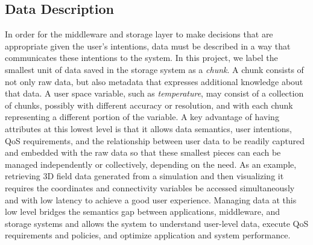 \subsection{Data Description}
In order for the middleware and storage layer to make decisions
that are appropriate given the user's intentions, data must be
described in a way that communicates these intentions to
the system. In this project, we label the smallest unit of data
saved in the storage system as a \textit{chunk}.  A chunk consists of not only
raw data, but also metadata that expresses additional
knowledge about that data.
A user space variable, such as \textit{temperature}, may
consist of a collection of chunks, possibly with different accuracy or
resolution, and with each chunk representing
a different portion of the variable.
A key advantage of having attributes at this lowest level is that it allows data
semantics, user intentions, QoS requirements, and the relationship between user
data to be readily captured and embedded with the raw data so that these
smallest pieces can each be managed independently or collectively, depending on
the need. As an example, retrieving 3D field data generated from a simulation
and then visualizing it requires the coordinates and connectivity variables be
accessed simultaneously and with low latency to achieve a good user experience.
Managing data at this low level
bridges the semantics gap between applications, middleware, and storage
systems and allows the system to understand user-level data, execute QoS
requirements and policies, and optimize application and system performance.


